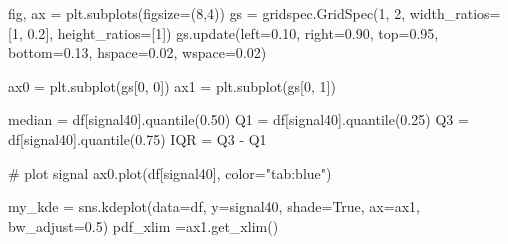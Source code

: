 \documentclass[
  letterpaper,
  DIV=11,
  numbers=noendperiod,
  oneside]{scrreprt}
\newenvironment{Shaded}{\begin{snugshade}}{\end{snugshade}}
\newcommand{\CommentTok}[1]{\textcolor[rgb]{0.37,0.37,0.37}{#1}}
\newcommand{\DecValTok}[1]{\textcolor[rgb]{0.68,0.00,0.00}{#1}}
\newcommand{\FloatTok}[1]{\textcolor[rgb]{0.68,0.00,0.00}{#1}}
\newcommand{\NormalTok}[1]{\textcolor[rgb]{0.00,0.23,0.31}{#1}}
\newcommand{\OperatorTok}[1]{\textcolor[rgb]{0.37,0.37,0.37}{#1}}
\newcommand{\StringTok}[1]{\textcolor[rgb]{0.13,0.47,0.30}{#1}}
\newcommand{\VariableTok}[1]{\textcolor[rgb]{0.07,0.07,0.07}{#1}}
\begin{document}
\begin{Shaded}
\begin{Highlighting}[]
\NormalTok{fig, ax }\OperatorTok{=}\NormalTok{ plt.subplots(figsize}\OperatorTok{=}\NormalTok{(}\DecValTok{8}\NormalTok{,}\DecValTok{4}\NormalTok{))}
\NormalTok{gs }\OperatorTok{=}\NormalTok{ gridspec.GridSpec(}\DecValTok{1}\NormalTok{, }\DecValTok{2}\NormalTok{, width\_ratios}\OperatorTok{=}\NormalTok{[}\DecValTok{1}\NormalTok{, }\FloatTok{0.2}\NormalTok{], height\_ratios}\OperatorTok{=}\NormalTok{[}\DecValTok{1}\NormalTok{])}
\NormalTok{gs.update(left}\OperatorTok{=}\FloatTok{0.10}\NormalTok{, right}\OperatorTok{=}\FloatTok{0.90}\NormalTok{, top}\OperatorTok{=}\FloatTok{0.95}\NormalTok{, bottom}\OperatorTok{=}\FloatTok{0.13}\NormalTok{,}
\NormalTok{          hspace}\OperatorTok{=}\FloatTok{0.02}\NormalTok{, wspace}\OperatorTok{=}\FloatTok{0.02}\NormalTok{)}

\NormalTok{ax0 }\OperatorTok{=}\NormalTok{ plt.subplot(gs[}\DecValTok{0}\NormalTok{, }\DecValTok{0}\NormalTok{])}
\NormalTok{ax1 }\OperatorTok{=}\NormalTok{ plt.subplot(gs[}\DecValTok{0}\NormalTok{, }\DecValTok{1}\NormalTok{])}

\NormalTok{median }\OperatorTok{=}\NormalTok{ df[}\StringTok{\textquotesingle{}signal40\textquotesingle{}}\NormalTok{].quantile(}\FloatTok{0.50}\NormalTok{)}
\NormalTok{Q1 }\OperatorTok{=}\NormalTok{ df[}\StringTok{\textquotesingle{}signal40\textquotesingle{}}\NormalTok{].quantile(}\FloatTok{0.25}\NormalTok{)}
\NormalTok{Q3 }\OperatorTok{=}\NormalTok{ df[}\StringTok{\textquotesingle{}signal40\textquotesingle{}}\NormalTok{].quantile(}\FloatTok{0.75}\NormalTok{)}
\NormalTok{IQR }\OperatorTok{=}\NormalTok{ Q3 }\OperatorTok{{-}}\NormalTok{ Q1}

\CommentTok{\# plot signal}
\NormalTok{ax0.plot(df[}\StringTok{\textquotesingle{}signal40\textquotesingle{}}\NormalTok{], color}\OperatorTok{=}\StringTok{"tab:blue"}\NormalTok{)}

\NormalTok{my\_kde }\OperatorTok{=}\NormalTok{ sns.kdeplot(data}\OperatorTok{=}\NormalTok{df, y}\OperatorTok{=}\StringTok{\textquotesingle{}signal40\textquotesingle{}}\NormalTok{, shade}\OperatorTok{=}\VariableTok{True}\NormalTok{, ax}\OperatorTok{=}\NormalTok{ax1, bw\_adjust}\OperatorTok{=}\FloatTok{0.5}\NormalTok{)}
\NormalTok{pdf\_xlim }\OperatorTok{=}\NormalTok{ax1.get\_xlim()}


\end{Highlighting}
\end{Shaded}
\end{document}
